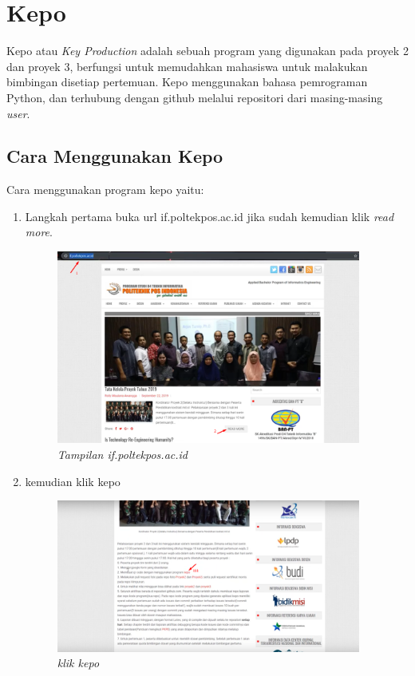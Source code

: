 \chapter{Kepo}
Kepo atau \textit{Key Production} adalah sebuah program yang digunakan pada proyek 2 dan proyek 3, berfungsi untuk memudahkan mahasiswa untuk malakukan bimbingan disetiap pertemuan. Kepo menggunakan bahasa pemrograman Python, dan terhubung dengan github melalui repositori dari masing-masing \textit{user}.


\section{Cara Menggunakan Kepo}
\par Cara menggunakan program kepo yaitu:

\begin{enumerate}
\item Langkah pertama buka url if.poltekpos.ac.id jika sudah kemudian klik \textit{read more}.

 \begin{figure}[!htbp]
    \centering
    \includegraphics[width=10cm]{figures/if}
    \caption{\textit{Tampilan if.poltekpos.ac.id}}
    
\end{figure} 

\newpage

\item kemudian klik kepo
\begin{figure}[!htbp]
    \centering
    \includegraphics[width=10cm]{figures/klikkepo}
    \caption{\textit{klik kepo}}
    

\end{figure}
\end{enumerate}
